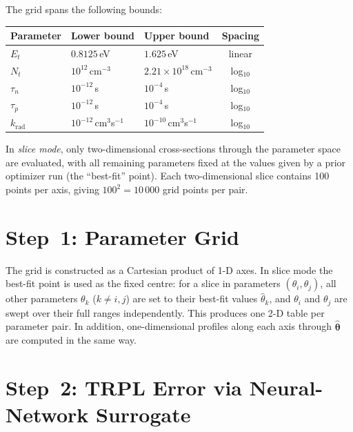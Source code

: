 \documentclass[a4paper,11pt]{article}
\newcommand{\btheta}{\boldsymbol{\theta}}
\begin{document}
The grid spans the following bounds:
\begin{center}
\begin{tabular}{lllc}
\toprule
Parameter & Lower bound & Upper bound & Spacing \\
\midrule
$E_t$            & $0.8125$\,eV         & $1.625$\,eV        & linear  \\
$N_t$            & $10^{12}$\,cm$^{-3}$ & $2.21\times10^{18}$\,cm$^{-3}$ & log$_{10}$ \\
$\tau_n$         & $10^{-12}$\,s        & $10^{-4}$\,s       & log$_{10}$ \\
$\tau_p$         & $10^{-12}$\,s        & $10^{-4}$\,s       & log$_{10}$ \\
$k_\mathrm{rad}$ & $10^{-12}$\,cm$^3$s$^{-1}$ & $10^{-10}$\,cm$^3$s$^{-1}$ & log$_{10}$ \\
\bottomrule
\end{tabular}
\end{center}

In \emph{slice mode}, only two-dimensional cross-sections through the
parameter space are evaluated, with all remaining parameters fixed at the
values given by a prior optimizer run (the ``best-fit'' point). Each
two-dimensional slice contains 100 points per axis, giving $100^2 = 10\,000$
grid points per pair.

\section{Step~1: Parameter Grid}

The grid is constructed as a Cartesian product of 1-D axes. In slice mode the
best-fit point is used as the fixed centre: for a slice in parameters
$(\theta_i, \theta_j)$, all other parameters $\theta_k$ ($k \neq i, j$) are
set to their best-fit values $\hat{\theta}_k$, and $\theta_i$ and $\theta_j$
are swept over their full ranges independently. This produces one 2-D table
per parameter pair. In addition, one-dimensional profiles along each axis
through $\hat{\btheta}$ are computed in the same way.

\section{Step~2: TRPL Error via Neural-Network Surrogate}
\end{document}

